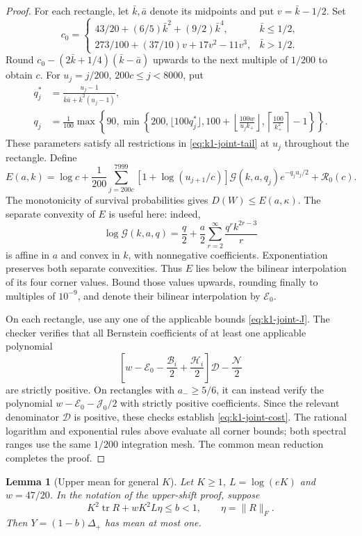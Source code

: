 \documentclass[11pt,a4paper]{article}
\numberwithin{equation}{section}
\newtheorem{lemma}[theorem]{Lemma}
\begin{document}
\begin{proof}
For each rectangle, let $\bar k,\bar a$ denote its midpoints and put
$v=\bar k-1/2$. Set
\[
 c_0=\begin{cases}
 43/20+(6/5)\bar k^2+(9/2)\bar k^4,&\bar k\le1/2,\\
 273/100+(37/10)v+17v^2-11v^3,&\bar k>1/2.
 \end{cases}
\]
Round $c_0-(2\bar k+1/4)(\bar k-\bar a)$ upwards to the next
multiple of $1/200$ to obtain $c$.
For $u_j=j/200$, $200c\le j<8000$, put
\[
 \begin{aligned}
 q_j^*&=\frac{u_j-1}{\bar k\bar a+\bar k^2(u_j-1)},\\
 q_j&=\frac1{100}\max\left\{90,
 \min\left\{200,\lfloor100q_j^*\rfloor,
 100+\left\lfloor\frac{100w}{u_jk_+}\right\rfloor,
 \left\lceil\frac{100}{k_+^2}\right\rceil-1\right\}\right\}.
 \end{aligned}
\]
These parameters satisfy all restrictions in
\eqref{eq:k1-joint-tail} at $u_j$ throughout the rectangle.
Define
\[
 E(a,k)=\log c+\frac1{200}\sum_{j=200c}^{7999}
 [1+\log(u_{j+1}/c)]\mathcal G(k,a,q_j)e^{-q_ju_j/2}
 +\mathcal R_0(c).
\]
The monotonicity of survival probabilities gives $D(W)\le E(a,\kappa)$.
The separate convexity of $E$ is useful here: indeed,
\[
 \log\mathcal G(k,a,q)=\frac q2+\frac a2
                \sum_{r=2}^{\infty}\frac{q^r k^{2r-3}}r
\]
is affine in $a$ and convex in $k$, with nonnegative coefficients.
Exponentiation preserves both separate convexities.
Thus $E$ lies below the bilinear interpolation of its four corner
values. Bound those values upwards, rounding finally to multiples of
$10^{-9}$, and denote their bilinear interpolation by $\mathcal E_0$.

On each rectangle, use any one of the applicable bounds
\eqref{eq:k1-joint-J}. The checker verifies that all Bernstein
coefficients of at least one applicable polynomial
\[
 \left[w-\mathcal E_0-\frac{\mathcal B_i}{2}
                      +\frac{\mathcal H_i}{2}\right]\mathcal D
                 -\frac{\mathcal N}{2}
\]
are strictly positive. On rectangles with $a_-\ge5/6$, it can instead
verify the polynomial $w-\mathcal E_0-\mathcal J_0/2$ with strictly positive coefficients. Since the relevant denominator $\mathcal D$ is
positive, these checks establish \eqref{eq:k1-joint-cost}.
The rational logarithm and exponential rules above evaluate all corner bounds;
both spectral ranges use the same $1/200$ integration mesh.
The common mean reduction completes the proof.
\end{proof}

\begin{lemma}[Upper mean for general $K$]\label{app:general-upper-drift}
Let $K\ge1$, $L=\log(eK)$ and $w=47/20$.
In the notation of the upper-shift proof, suppose
\[
 K^2\operatorname{tr}R+wK^2L\eta\le b<1,
 \qquad \eta=\|R\|_F.
\]
Then $Y=(1-b)\Delta_+$ has mean at most one.
\end{lemma}
\end{document}
